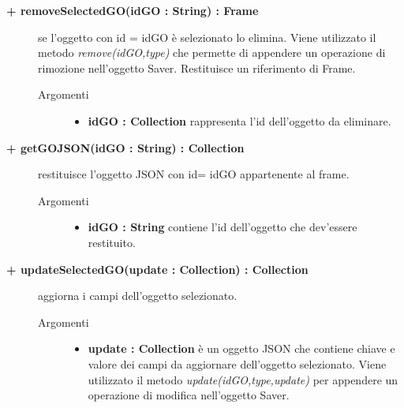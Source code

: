 \begin{description}
\begin{description}
\begin{description}
\begin{description}
\end{description}

\end{description}


\begin{description}
		\item[\textbf{\color{blue}+ removeSelectedGO(idGO : String) : Frame			}] \hfill
			se l'oggetto con id = idGO è selezionato lo elimina. Viene utilizzato il metodo \textit{remove(idGO,type)} che permette di appendere un operazione di rimozione nell'oggetto Saver. Restituisce un riferimento di Frame.

\begin{description}
			\item[Argomenti] \hfill
				\begin{itemize}
						\item \textbf{idGO : Collection			} \hfill
						rappresenta l'id dell'oggetto da eliminare.
				\end{itemize}

\end{description}

\end{description}


\begin{description}
		\item[\textbf{\color{blue}+ getGOJSON(idGO : String) : Collection			}] \hfill
			restituisce l'oggetto JSON con id= idGO appartenente al frame.   

\begin{description}
			\item[Argomenti] \hfill
				\begin{itemize}
						\item \textbf{idGO : String			} \hfill
					contiene l'id dell'oggetto che dev'essere restituito.
				\end{itemize}

\end{description}

\end{description}

\begin{description}
		\item[\textbf{\color{blue}+ updateSelectedGO(update : Collection) : Collection			}] \hfill
			aggiorna i campi dell'oggetto selezionato.   

\begin{description}
			\item[Argomenti] \hfill
				\begin{itemize}
						\item \textbf{update : Collection			} \hfill
					è un oggetto JSON che contiene chiave e valore dei campi da aggiornare dell'oggetto selezionato. Viene utilizzato il metodo \textit{update(idGO,type,update)} per appendere un operazione di modifica nell'oggetto Saver.
				\end{itemize}


\end{description}
\end{description}
\end{description}
\end{description}
